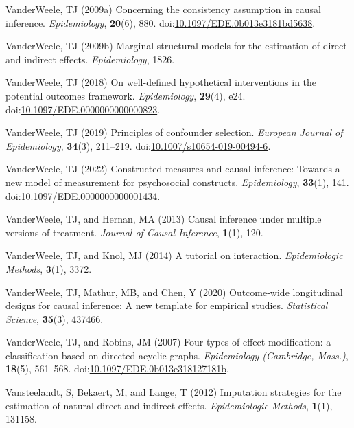 \documentclass[
  singlecolumn,
  9pt]{article}
\newlength{\cslhangindent}
\newenvironment{CSLReferences}[2] %
 {\begin{list}{}{%
  \setlength{\itemindent}{0pt}
  \setlength{\leftmargin}{0pt}
  \setlength{\parsep}{0pt}
  \ifodd #1
   \setlength{\leftmargin}{\cslhangindent}
   \setlength{\itemindent}{-1\cslhangindent}
  \fi
  \setlength{\itemsep}{#2\baselineskip}}}
 {\end{list}}
\begin{document}
\begin{CSLReferences}{1}{0}
VanderWeele, TJ (2009a) Concerning the consistency assumption in causal
inference. \emph{Epidemiology}, \textbf{20}(6), 880.
doi:\href{https://doi.org/10.1097/EDE.0b013e3181bd5638}{10.1097/EDE.0b013e3181bd5638}.

VanderWeele, TJ (2009b) Marginal structural models for the estimation of
direct and indirect effects. \emph{Epidemiology}, 1826.

VanderWeele, TJ (2018) On well-defined hypothetical interventions in the
potential outcomes framework. \emph{Epidemiology}, \textbf{29}(4), e24.
doi:\href{https://doi.org/10.1097/EDE.0000000000000823}{10.1097/EDE.0000000000000823}.

VanderWeele, TJ (2019) Principles of confounder selection.
\emph{European Journal of Epidemiology}, \textbf{34}(3), 211--219.
doi:\href{https://doi.org/10.1007/s10654-019-00494-6}{10.1007/s10654-019-00494-6}.

VanderWeele, TJ (2022) Constructed measures and causal inference:
Towards a new model of measurement for psychosocial constructs.
\emph{Epidemiology}, \textbf{33}(1), 141.
doi:\href{https://doi.org/10.1097/EDE.0000000000001434}{10.1097/EDE.0000000000001434}.

VanderWeele, TJ, and Hernan, MA (2013) Causal inference under multiple
versions of treatment. \emph{Journal of Causal Inference},
\textbf{1}(1), 120.

VanderWeele, TJ, and Knol, MJ (2014) A tutorial on interaction.
\emph{Epidemiologic Methods}, \textbf{3}(1), 3372.

VanderWeele, TJ, Mathur, MB, and Chen, Y (2020) Outcome-wide
longitudinal designs for causal inference: A new template for empirical
studies. \emph{Statistical Science}, \textbf{35}(3), 437466.

VanderWeele, TJ, and Robins, JM (2007) Four types of effect
modification: a classification based on directed acyclic graphs.
\emph{Epidemiology (Cambridge, Mass.)}, \textbf{18}(5), 561--568.
doi:\href{https://doi.org/10.1097/EDE.0b013e318127181b}{10.1097/EDE.0b013e318127181b}.

Vansteelandt, S, Bekaert, M, and Lange, T (2012) Imputation strategies
for the estimation of natural direct and indirect effects.
\emph{Epidemiologic Methods}, \textbf{1}(1), 131158.


\end{CSLReferences}
\end{document}
